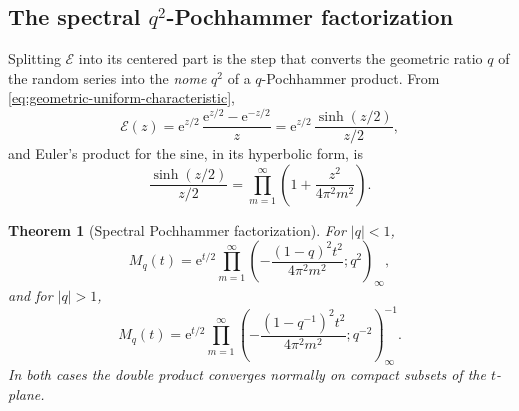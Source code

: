 \documentclass[11pt,oneside,openany]{book}
\newtheorem{theorem}{Theorem}[chapter]
\theoremstyle{definition}
\theoremstyle{remark}
\newcommand{\poch}[3]{(#1;#2)_{#3}}
\newcommand{\e}{\mathrm e}
\newcommand{\abs}[1]{\lvert #1\rvert}
\begin{document}
\subsection{The spectral \texorpdfstring{$q^2$}{q2}-Pochhammer factorization}

Splitting $\mathcal E$ into its centered part is the step that converts the
geometric ratio $q$ of the random series into the \emph{nome} $q^2$ of a
$q$-Pochhammer product.  From \eqref{eq:geometric-uniform-characteristic},
\begin{equation}\label{eq:qF-Ecal-centered}
 \mathcal E(z)
 =\e^{z/2}\,\frac{\e^{z/2}-\e^{-z/2}}{z}
 =\e^{z/2}\,\frac{\sinh(z/2)}{z/2},
\end{equation}
and Euler's product for the sine, in its hyperbolic form, is
\begin{equation}\label{eq:qF-sinh-product}
 \frac{\sinh(z/2)}{z/2}
 =\prod_{m=1}^{\infty}\left(1+\frac{z^2}{4\pi^2m^2}\right).
\end{equation}

\begin{theorem}[Spectral Pochhammer factorization]\label{thm:qF-spectral}
For $\abs q<1$,
\begin{equation}\label{eq:qF-spectral-inside}
 M_q(t)=\e^{t/2}\prod_{m=1}^{\infty}
 \poch{-\dfrac{(1-q)^2t^2}{4\pi^2m^2}}{q^2}{\infty},
\end{equation}
and for $\abs q>1$,
\begin{equation}\label{eq:qF-spectral-outside}
 M_q(t)=\e^{t/2}\prod_{m=1}^{\infty}
 \poch{-\dfrac{(1-q^{-1})^2t^2}{4\pi^2m^2}}{q^{-2}}{\infty}^{-1}.
\end{equation}
In both cases the double product converges normally on compact subsets of the
$t$-plane.
\end{theorem}
\end{document}
